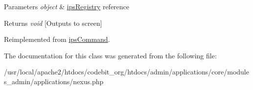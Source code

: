 \begin{DoxyParams}{Parameters}
{\em object} & \hyperlink{classips_registry}{ips\-Registry} reference \\
\hline
\end{DoxyParams}
\begin{DoxyReturn}{Returns}
{\itshape void} \mbox{[}Outputs to screen\mbox{]} 
\end{DoxyReturn}


Reimplemented from \hyperlink{classips_command_afbc4e912a0604b94d47d66744c64d8ba}{ips\-Command}.



The documentation for this class was generated from the following file\-:\begin{DoxyCompactItemize}
\item 
/usr/local/apache2/htdocs/codebit\-\_\-org/htdocs/admin/applications/core/modules\-\_\-admin/applications/nexus.\-php\end{DoxyCompactItemize}

